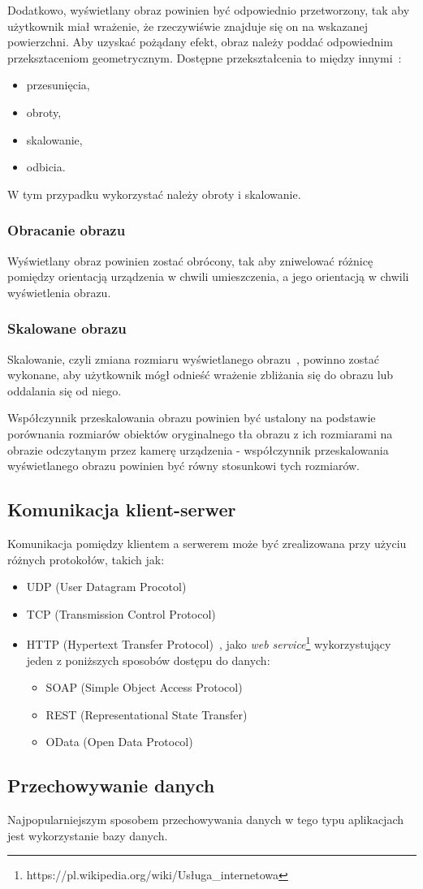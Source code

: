 Dodatkowo, wyświetlany obraz powinien być odpowiednio przetworzony, tak aby użytkownik miał wrażenie, że rzeczywiświe znajduje się on na wskazanej powierzchni.
Aby uzyskać pożądany efekt, obraz należy poddać odpowiednim przeksztaceniom geometrycznym.
Dostępne przekształcenia to między innymi~\cite{anal:przet:obr}:
\begin{itemize}
 \item przesunięcia,
 \item obroty,
 \item skalowanie,
 \item odbicia.
\end{itemize}

W tym przypadku wykorzystać należy obroty i skalowanie.

\subsubsection{Obracanie obrazu}
Wyświetlany obraz powinien zostać obrócony, tak aby zniwelować różnicę pomiędzy orientacją urządzenia w chwili umieszczenia, a jego orientacją w chwili wyświetlenia obrazu.


\subsubsection{Skalowane obrazu}
Skalowanie, czyli zmiana rozmiaru wyświetlanego obrazu~\cite{geo:tools}, powinno zostać wykonane, aby użytkownik mógł odnieść wrażenie zbliżania się do obrazu lub oddalania się od niego.

Współczynnik przeskalowania obrazu powinien być ustalony na podstawie porównania rozmiarów obiektów oryginalnego tła obrazu z ich rozmiarami na obrazie odczytanym przez kamerę urządzenia - współczynnik przeskalowania wyświetlanego obrazu powinien być równy stosunkowi tych rozmiarów.



\subsection{Komunikacja klient-serwer}
Komunikacja pomiędzy klientem a serwerem może być zrealizowana przy użyciu różnych protokołów, takich jak:
\begin{itemize}
 \item UDP (User Datagram Procotol)~\cite{udp}
 \item TCP (Transmission Control Protocol)~\cite{tcp}
 \item HTTP (Hypertext Transfer Protocol)~\cite{http1,http2}, jako \emph{web service}\footnote{https://pl.wikipedia.org/wiki/Usługa\_internetowa} wykorzystujący jeden z poniższych sposobów dostępu do danych:
  \begin{itemize}
   \item SOAP (Simple Object Access Protocol)~\cite{soap}
   \item REST (Representational State Transfer)~\cite{rest}
   \item OData (Open Data Protocol)~\cite{odata}
  \end{itemize}
\end{itemize}


\subsection{Przechowywanie danych}
Najpopularniejszym sposobem przechowywania danych w tego typu aplikacjach jest wykorzystanie bazy danych.